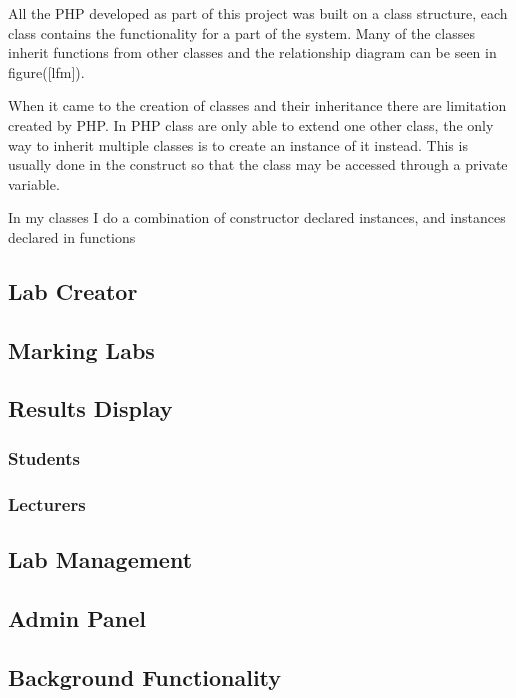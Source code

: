 \documentclass[12pt]{article}  %
\begin{document}
All the PHP developed as part of this project was built on a class structure, each class contains the functionality for a part of the system. Many of the classes inherit functions from other classes and the relationship diagram can be seen in figure([lfm]). 

When it came to the creation of classes and their inheritance there are limitation created by PHP. In PHP class are only able to extend one other class, the only way to inherit multiple classes is to create an instance of it instead. This is usually done in the construct so that the class may be accessed through a private variable. 


In my classes I do a combination of constructor declared instances, and instances declared in functions




\subsection{Lab Creator}

\subsection{Marking Labs}

\subsection{Results Display}
\subsubsection{Students}
\subsubsection{Lecturers}

\subsection{Lab Management}

\subsection{Admin Panel}

\subsection{Background Functionality}
\end{document}
